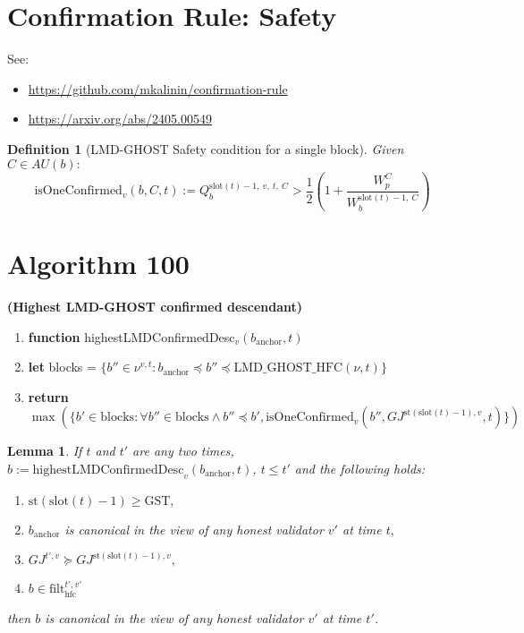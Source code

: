 \documentclass{article}
\newtheorem{lemma}{Lemma}
\newtheorem{definition}{Definition}
\begin{document}
\section*{Confirmation Rule: Safety}

See:
\begin{itemize}
    \item \href{https://github.com/mkalinin/confirmation-rule}{https://github.com/mkalinin/confirmation-rule}
    \item \href{https://arxiv.org/abs/2405.00549}{https://arxiv.org/abs/2405.00549}
\end{itemize}

\begin{definition}[LMD-GHOST Safety condition for a single block]
    Given $C \in AU(b):$
    \[
    \text{isOneConfirmed}_v(b, C, t) := Q^{\text{slot}(t)-1,\ v,\ t,\ C}_{b} > \frac{1}{2}\left(1 + \frac{W^C_p}{W^{\text{slot}(t)-1,\ C}_b}\right)
    \]
\end{definition}

\section*{Algorithm 100}
\textbf{(Highest LMD-GHOST confirmed descendant)}

\begin{enumerate}
    \item \textbf{function} highestLMDConfirmedDesc$_v(b_{\text{anchor}}, t)$
    \item \quad \textbf{let} blocks = $\{b'' \in \nu^{v,t} : b_{\text{anchor}} \preceq b'' \preceq \text{LMD\_GHOST\_HFC}(\nu, t)\}$
    \item \quad \textbf{return} $\max(\{b' \in \text{blocks} : \forall b'' \in \text{blocks} \wedge b'' \preceq b', \text{isOneConfirmed}_v(b'', GJ^{\text{st}(\text{slot}(t) - 1),v}, t)\})$
\end{enumerate}

\begin{lemma}
If $t$ and $t'$ are any two times, $b := \text{highestLMDConfirmedDesc}_v(b_{\text{anchor}}, t)$, $t \leq t'$ and the following holds:
\begin{enumerate}
    \item $\text{st}(\text{slot}(t) - 1) \geq \text{GST},$
    \item $b_{\text{anchor}}$ is canonical in the view of any honest validator $v'$ at time $t,$
    \item $GJ^{t',v} \succeq GJ^{\text{st}(\text{slot}(t) - 1),v},$
    \item $b \in \text{filt}^{t',v'}_{\text{hfc}}$
\end{enumerate}

then $b$ is canonical in the view of any honest validator $v'$ at time $t'$.
\end{lemma}
\end{document}
